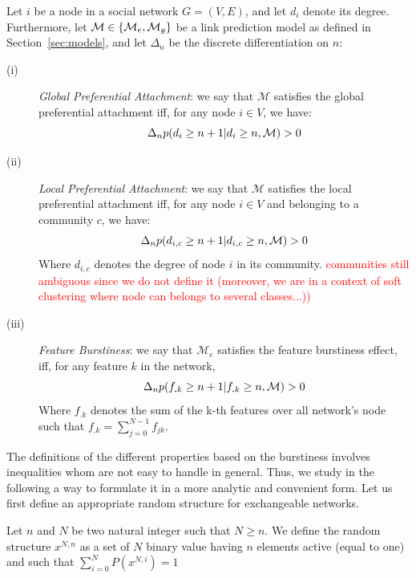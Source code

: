 \begin{definition}
Let $i$ be a node in a social network $G=(V,E)$, and let $d_i$ denote its degree. Furthermore, let $\mathcal{M} \in \{\mathcal{M}_e, \mathcal{M}_g\}$ be a link prediction model as defined in Section~\ref{sec:models}, and let $\Delta_n$ be the discrete differentiation on $n$: 
\begin{description}
\item[(i)] \emph{Global Preferential Attachment}: we say that $\mathcal{M}$ satisfies the global preferential attachment iff, for any node $i \in V$, we have:
 \begin{equation}
 \Delta_n p(d_i \geq n+1 | d_i \geq n,  \mathcal{M}) > 0
 \end{equation}
\item[(ii)] \emph{Local Preferential Attachment}: we say that $\mathcal{M}$ satisfies the local preferential attachment iff, for any node $i \in V$ and belonging to a community  $c$, we have:
  \begin{equation}
 \Delta_n p(d_{i,c} \geq n+1 | d_{i,c} \geq n,  \mathcal{M}) > 0
 \end{equation}
  Where $d_{i,c}$ denotes the degree of node $i$ in its community. \textcolor{red}{communities still ambiguous since we do not define it (moreover, we are in a context of soft clustering where node can belongs to several classes...)) }
\item[(iii)] \emph{Feature Burstiness}: we say that $\mathcal{M}_e$ satisfies the feature burstiness effect, iff, for any feature $k$ in the network,   
  \begin{equation}
	\Delta_n p(f_{\bm{.}k} \geq n+1 | f_{\bm{.}k} \geq n,  \mathcal{M}) > 0
  \end{equation}
   Where $f_{\bm{.}k}$ denotes the sum of the k-th features over all network's node such that $f_{\bm{.}k} = \sum_{j=0}^{N-1} f_{jk}$.
\end{description}
\label{def:burst-soc-net}
\end{definition}
%
The definitions of the different properties based on the burstiness involves inequalities whom are not easy to handle in general. Thus, we study in the following a way to formulate it in a more analytic and convenient form. Let us first define an appropriate random structure for exchangeable networks.

\begin{definition}
	Let $n$ and $N$ be two natural integer such that $N \geq n$. We define the random structure $x^{N,n}$ as a set of $N$ binary value having $n$ elements active (equal to one) and such that $\sum_{i=0}^N P(x^{N,i}) = 1$
	\label{def:rd_struct}
\end{definition}

